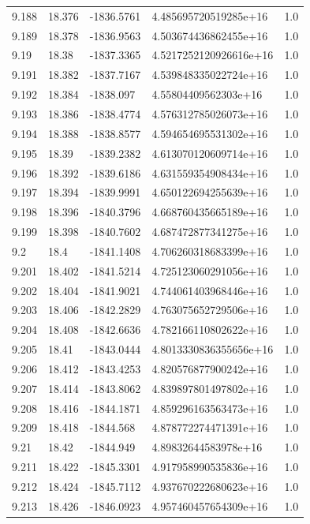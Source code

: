 \begin{tabular}{lllll}
9.188 & 18.376 & -1836.5761 & 4.485695720519285e+16 & 1.0 \\
9.189 & 18.378 & -1836.9563 & 4.503674436862455e+16 & 1.0 \\
9.19 & 18.38 & -1837.3365 & 4.5217252120926616e+16 & 1.0 \\
9.191 & 18.382 & -1837.7167 & 4.539848335022724e+16 & 1.0 \\
9.192 & 18.384 & -1838.097 & 4.55804409562303e+16 & 1.0 \\
9.193 & 18.386 & -1838.4774 & 4.576312785026073e+16 & 1.0 \\
9.194 & 18.388 & -1838.8577 & 4.594654695531302e+16 & 1.0 \\
9.195 & 18.39 & -1839.2382 & 4.613070120609714e+16 & 1.0 \\
9.196 & 18.392 & -1839.6186 & 4.631559354908434e+16 & 1.0 \\
9.197 & 18.394 & -1839.9991 & 4.650122694255639e+16 & 1.0 \\
9.198 & 18.396 & -1840.3796 & 4.668760435665189e+16 & 1.0 \\
9.199 & 18.398 & -1840.7602 & 4.687472877341275e+16 & 1.0 \\
9.2 & 18.4 & -1841.1408 & 4.706260318683399e+16 & 1.0 \\
9.201 & 18.402 & -1841.5214 & 4.725123060291056e+16 & 1.0 \\
9.202 & 18.404 & -1841.9021 & 4.744061403968446e+16 & 1.0 \\
9.203 & 18.406 & -1842.2829 & 4.763075652729506e+16 & 1.0 \\
9.204 & 18.408 & -1842.6636 & 4.782166110802622e+16 & 1.0 \\
9.205 & 18.41 & -1843.0444 & 4.8013330836355656e+16 & 1.0 \\
9.206 & 18.412 & -1843.4253 & 4.820576877900242e+16 & 1.0 \\
9.207 & 18.414 & -1843.8062 & 4.839897801497802e+16 & 1.0 \\
9.208 & 18.416 & -1844.1871 & 4.859296163563473e+16 & 1.0 \\
9.209 & 18.418 & -1844.568 & 4.878772274471391e+16 & 1.0 \\
9.21 & 18.42 & -1844.949 & 4.89832644583978e+16 & 1.0 \\
9.211 & 18.422 & -1845.3301 & 4.917958990535836e+16 & 1.0 \\
9.212 & 18.424 & -1845.7112 & 4.937670222680623e+16 & 1.0 \\
9.213 & 18.426 & -1846.0923 & 4.957460457654309e+16 & 1.0 \\

\end{tabular}
